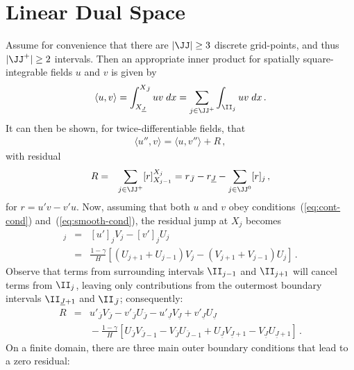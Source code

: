\documentclass[12pt,a5paper]{article}
\begin{document}
\section{Linear Dual Space}
Assume for convenience that there are $|\JJ|\ge 3$ discrete grid-points, and thus $|\JJ^+|\ge 2$ intervals.
Then an appropriate inner product for spatially square-integrable fields $u$ and $v$ is given by
\begin{eqnarray}
\langle u,v\rangle = \int_{X_{\underline{J}}}^{X_{\bar{J}}}uv\;dx
= \sum_{j\in\JJ^+}\int_{\II_j}uv\;dx\,.
\end{eqnarray}
It can then be shown, for twice-differentiable fields, that
\begin{eqnarray}
\langle u'',v\rangle =
\langle u,v''\rangle + R\,,
\end{eqnarray}
with residual 
\begin{eqnarray}
R &= & \sum_{j\in\JJ^+}[r]_{X_{j-1}}^{X_j}
= r_{\bar{J}}-r_{\underline{J}}-\sum_{j\in\JJ^0}[r]_j\,,
\end{eqnarray}
for $r=u'v-v'u$.
Now, assuming that both $u$ and $v$ obey conditions~(\ref{eq:cont-cond}) and~(\ref{eq:smooth-cond}), 
the residual jump at $X_j$ becomes
\begin{eqnarray}
[r]_j & = & [u']_j V_j-[v']_j U_j
\nonumber\\
& = & \frac{1-\gamma}{H}\left[
(U_{j+1}+U_{j-1})V_j-(V_{j+1}+V_{j-1})U_j
\right]\,.
\end{eqnarray}
Observe that terms from surrounding intervals $\II_{j-1}$ and $\II_{j+1}$ will cancel terms from $\II_j$, leaving
only contributions from the outermost boundary intervals $\II_{\underline{J}+1}$ and $\II_{\bar{J}}$; consequently:
\begin{eqnarray}
R & = & 
u'_{\bar{J}}V_{\bar{J}}-v'_{\bar{J}}U_{\bar{J}}
-u'_{\underline{J}}V_{\underline{J}}+v'_{\underline{J}}U_{\underline{J}}
\nonumber\\ &&
{}-\frac{1-\gamma}{H}\left[
U_{\bar{J}}V_{\bar{J}-1}-V_{\bar{J}}U_{\bar{J}-1}
+U_{\underline{J}}V_{\underline{J}+1}-V_{\underline{J}}U_{\underline{J}+1}
\right]\,.
\end{eqnarray}
On a finite domain, there are three main outer boundary conditions that lead to a zero residual:
\end{document}
